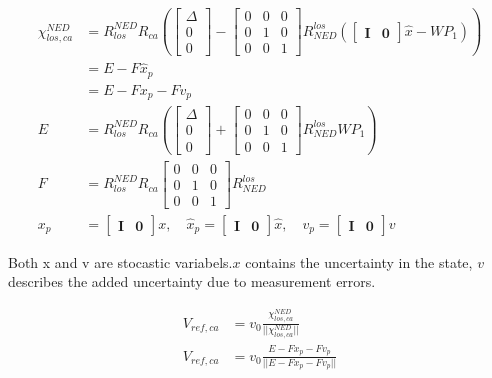 \begin{align}
    \chi^{NED}_{los,ca} & = R^{NED}_{los}  R_{ca} \left(  \begin{bmatrix}\Delta \\ 0 \\ 0\end{bmatrix} - \begin{bmatrix} 0 & 0 & 0 \\ 0 & 1 & 0 \\ 0 & 0 & 1 \end{bmatrix} R^{los}_{NED} (\begin{bmatrix} \mathbf{I} & \mathbf{0} \end{bmatrix} \hat{x} - WP_1) \right) \\
    & = E - F \hat{x}_p \\
     & = E - F x_p - F v_p \\
    E & = R^{NED}_{los}  R_{ca} \left(  \begin{bmatrix}\Delta \\ 0 \\ 0\end{bmatrix} + \begin{bmatrix} 0 & 0 & 0 \\ 0 & 1 & 0 \\ 0 & 0 & 1 \end{bmatrix} R^{los}_{NED} WP_1 \right) \\
    F & = R^{NED}_{los}  R_{ca}  \begin{bmatrix} 0 & 0 & 0 \\ 0 & 1 & 0 \\ 0 & 0 & 1 \end{bmatrix} R^{los}_{NED}\\
    x_p & = \begin{bmatrix}\mathbf{I}  &\mathbf{0}\end{bmatrix} x, \quad 
    \hat{x}_p  = \begin{bmatrix}\mathbf{I}& \mathbf{0}\end{bmatrix} \hat{x}, \quad
    v_p  = \begin{bmatrix}\mathbf{I}& \mathbf{0}\end{bmatrix} v 
\end{align}

Both x and v are stocastic variabels.$x$ contains the uncertainty in the state, $v$ describes the added uncertainty due to measurement errors. 

\begin{align}
        V_{ref,ca} & = v_0 \frac{\chi^{NED}_{los,ca} }{|| \chi^{NED}_{los,ca} ||} \\
        V_{ref,ca} & = v_0 \frac{E - F x_p - F v_p }{|| E - F x_p - F v_p ||}
\end{align}

